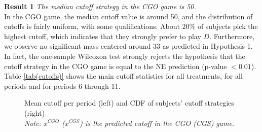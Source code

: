 \documentclass[12pt, letterpaper]{article}
\theoremstyle{plain}
\begin{document}
\noindent \textbf{Result 1}
\textit{The median cutoff strategy in the CGO game is 50.}\\

 In the CGO game, the median cutoff value is around 50, and the distribution of cutoffs is fairly uniform, with some qualifications. About 20\% of subjects pick the highest cutoff, which indicates that they strongly prefer to play $D$. Furthermore, we observe no significant mass centered around 33 as predicted in Hypothesis 1. In fact, the one-sample Wilcoxon test strongly rejects the hypothesis that the cutoff strategy in the CGO game is equal to the NE prediction (p-value $< 0.01$). Table \ref{tab(cutoffs)} shows the main cutoff statistics for all treatments, for all periods and for periods 6 through 11. \\
 
\begin{center}
\begin{figure}[ht]
\centering{}%
\begin{minipage}[t]{0.45\columnwidth}%
%
\end{minipage}%
\begin{minipage}[t]{0.45\columnwidth}%
%
\end{minipage} 
\caption{Mean cutoff per period (left) and CDF of subjects' cutoff strategies (right) \\\footnotesize{\textit{Note: $x^{CGO}$ ($x^{CGS}$) is the predicted cutoff in the CGO (CGS) game.}} }
\label{fig:allcutoff}\end{figure}
\par\end{center}
\end{document}
